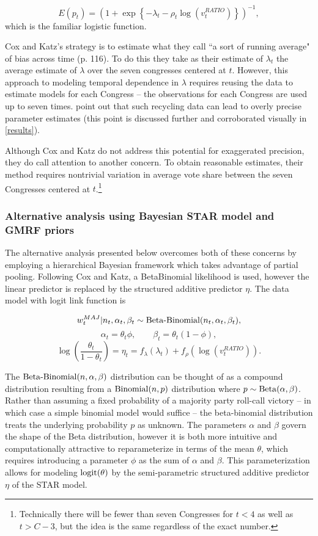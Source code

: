 \begin{equation*}
  E(p_t)  = \left(1 + \exp{\left\{- \lambda_t - \rho_t \log{\left( v_t^{RATIO}  \right)}\right\}}\right)^{-1},
\end{equation*}
%
\noindent which is the familiar logistic function. 

Cox and Katz's strategy is to estimate what they call ``a sort of running average" of bias across time (p. 116). To do this they take as their estimate of $\lambda_t$ the average estimate of $\lambda$ over the seven congresses centered at $t$. However, this approach to modeling temporal dependence in $\lambda$ requires reusing the data to estimate models for each Congress -- the observations for each Congress are used up to seven times.   point out that such recycling data can lead to overly precise parameter estimates (this point is discussed further and corroborated visually in \ref{results}). 

Although Cox and Katz do not address this potential for exaggerated precision, they do call attention to another  concern. To obtain reasonable estimates, their method requires nontrivial variation in average vote share between the seven Congresses centered at $t$.\footnote{Technically there will be fewer than seven Congresses for $t < 4$ as well as $t > C- 3$, but the idea is the same regardless of the exact number.}

\subsubsection{Alternative analysis using Bayesian STAR model and GMRF priors}

The alternative analysis presented below overcomes both of these concerns by employing a hierarchical Bayesian framework which takes advantage of partial pooling. Following Cox and Katz, a BetaBinomial likelihood is used, however the linear predictor is replaced by the structured additive predictor $\eta$. The data model with logit link function is 

$$w_t^{MAJ} | n_t, \alpha_t, \beta_t \sim {\rm Beta\text{-}Binomial}(n_t, \alpha_t, \beta_t),$$
$$ \alpha_t = \theta_t \phi, \qquad \beta_t = \theta_t (1 - \phi),$$
$$ \log\left({\frac{\theta_t}{1 - \theta_t}}\right) = \eta_t = f_{\lambda}(\lambda_t) + f_\rho \left(\log{(v_t^{RATIO})}\right).$$

The ${\rm Beta\text{-}Binomial}(n,\alpha,\beta)$ distribution can be thought of as a compound distribution resulting from a ${\rm Binomial}(n,p)$ distribution where $p \sim {\rm Beta}(\alpha,\beta)$. Rather than assuming a fixed probability of a majority party roll-call victory -- in which case a simple binomial model would suffice -- the beta-binomial distribution treats the underlying probability $p$ as unknown. The parameters $\alpha$ and $\beta$ govern the shape of the Beta distribution, however it is both more intuitive and computationally attractive to reparameterize in terms of the mean $\theta$, which requires introducing a parameter $\phi$ as the sum of $\alpha$ and $\beta$.  This parameterization allows for modeling ${\rm logit}(\theta)$ by the semi-parametric structured additive predictor $\eta$ of the STAR model. 

